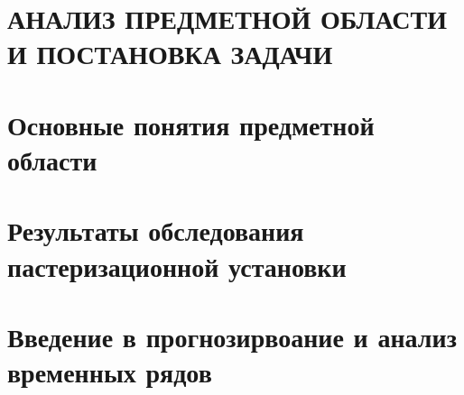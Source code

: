 \sectionbreak \section*{АНАЛИЗ ПРЕДМЕТНОЙ ОБЛАСТИ И ПОСТАНОВКА ЗАДАЧИ}

\section*{Основные понятия предметной области}

\section*{Результаты обследования пастеризационной установки}

\section*{Введение в прогнозирвоание и анализ временных рядов}

